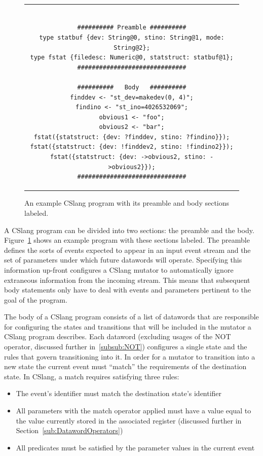 \begin{figure}[h]
\centering
\begin{tabular}{c}
\begin{lstlisting}

########## Preamble ##########
type statbuf {dev: String@0, stino: String@1, mode: String@2};
type fstat {filedesc: Numeric@0, statstruct: statbuf@1};
##############################

##########   Body   ##########
finddev <- "st_dev=makedev(0, 4)";
findino <- "st_ino=4026532069";
obvious1 <- "foo";
obvious2 <- "bar";
fstat({statstruct: {dev: ?finddev, stino: ?findino}});
fstat({statstruct: {dev: !finddev2, stino: !findino2}});
fstat({statstruct: {dev: ->obvious2, stino: ->obvious2}});
##############################

\end{lstlisting}
\end{tabular}
\caption{An example CSlang program with its preamble and body sections
  labeled.}
\label{lst:PreambleBody}
\end{figure}



A CSlang program can be divided into two sections: the preamble and the body.
Figure~\ref{lst:PreambleBody} shows an example program with these sections
labeled.
The preamble defines the sorts of events
expected
to appear in an input event stream and the set of parameters
under which future datawords will operate.  Specifying this information
up-front configures a CSlang mutator to
automatically ignore extraneous information from the incoming stream.  This
means that subsequent body statements only have to deal with events and
parameters pertinent to the goal of the program.

The body of a CSlang program consists of a list of datawords that
are responsible for configuring the states and transitions
that will be included in the mutator a CSlang program describes.
Each dataword (excluding usages of the NOT operator, discussed further
in~\ref{subsub:NOT}) configures a single
state and the rules that govern transitioning into it.
In order for a mutator to transition into a new state
the current event must ``match'' the requirements of the destination state.
In CSlang, a match requires satisfying three rules:

\begin{itemize}
\item{The event's identifier must match the destination state's identifier}
\item{All parameters with the match operator applied must have a value equal to
  the value currently stored in the associated register (discussed further
    in Section~\ref{sub:DatawordOperators})}
\item{All predicates must be satisfied by the parameter values in the
  current event}
\end{itemize}




